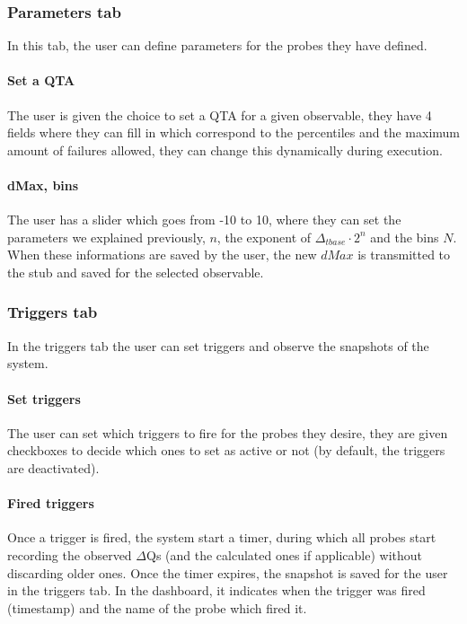     \subsubsection{Parameters tab}
        In this tab, the user can define parameters for the probes they have defined.

    \paragraph{Set a QTA}
        The user is given the choice to set a QTA for a given observable, they have 4 fields where they can fill in which correspond to the percentiles and the maximum amount of failures allowed, they can change this dynamically during execution.

    \paragraph{dMax, bins}
        The user has a slider which goes from -10 to 10, where they can set the parameters we explained previously, $n$, the exponent of $\Delta_{tbase} \cdot 2^n$ and the bins $N$. When these informations are saved by the user, the new $dMax$ is transmitted to the stub and saved for the selected observable.

    \subsubsection{Triggers tab}
        In the triggers tab the user can set triggers and observe the snapshots of the system.

    \paragraph{Set triggers}
        The user can set which triggers to fire for the probes they desire, they are given checkboxes to decide which ones to set as active or not (by default, the triggers are deactivated).
    
    \paragraph{Fired triggers}
        Once a trigger is fired, the system start a timer, during which all probes start recording the observed $\Delta$Qs (and the calculated ones if applicable) without discarding older ones. Once the timer expires, the snapshot is saved for the user in the triggers tab. In the dashboard, it indicates when the trigger was fired (timestamp) and the name of the probe which fired it.
    

